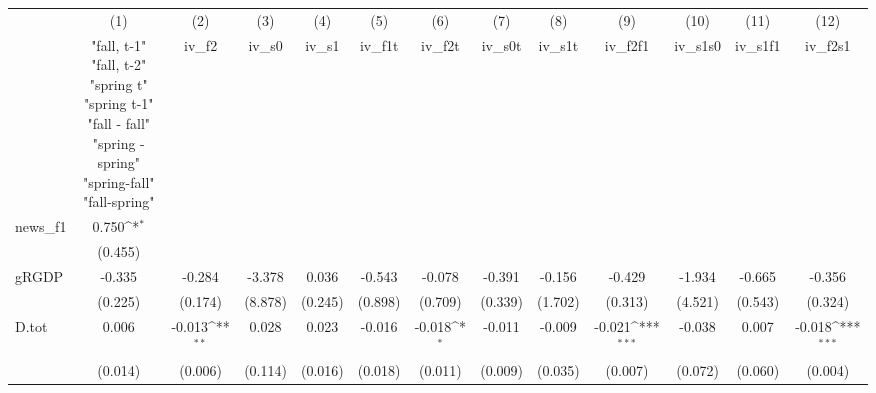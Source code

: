 {
\def\sym#1{\ifmmode^{#1}\else\(^{#1}\)\fi}
\begin{tabular}{l*{12}{c}}
\toprule
            &\multicolumn{1}{c}{(1)}&\multicolumn{1}{c}{(2)}&\multicolumn{1}{c}{(3)}&\multicolumn{1}{c}{(4)}&\multicolumn{1}{c}{(5)}&\multicolumn{1}{c}{(6)}&\multicolumn{1}{c}{(7)}&\multicolumn{1}{c}{(8)}&\multicolumn{1}{c}{(9)}&\multicolumn{1}{c}{(10)}&\multicolumn{1}{c}{(11)}&\multicolumn{1}{c}{(12)}\\
            &\multicolumn{1}{c}{  "fall, t-1" "fall, t-2" "spring t" "spring t-1"  "fall - fall" "spring - spring" "spring-fall" "fall-spring" }&\multicolumn{1}{c}{iv\_f2}&\multicolumn{1}{c}{iv\_s0}&\multicolumn{1}{c}{iv\_s1}&\multicolumn{1}{c}{iv\_f1t}&\multicolumn{1}{c}{iv\_f2t}&\multicolumn{1}{c}{iv\_s0t}&\multicolumn{1}{c}{iv\_s1t}&\multicolumn{1}{c}{iv\_f2f1}&\multicolumn{1}{c}{iv\_s1s0}&\multicolumn{1}{c}{iv\_s1f1}&\multicolumn{1}{c}{iv\_f2s1}\\
\midrule
news\_f1     &       0.750\sym{*}  &                     &                     &                     &                     &                     &                     &                     &                     &                     &                     &                     \\
            &     (0.455)         &                     &                     &                     &                     &                     &                     &                     &                     &                     &                     &                     \\
\addlinespace
gRGDP       &      -0.335         &      -0.284         &      -3.378         &       0.036         &      -0.543         &      -0.078         &      -0.391         &      -0.156         &      -0.429         &      -1.934         &      -0.665         &      -0.356         \\
            &     (0.225)         &     (0.174)         &     (8.878)         &     (0.245)         &     (0.898)         &     (0.709)         &     (0.339)         &     (1.702)         &     (0.313)         &     (4.521)         &     (0.543)         &     (0.324)         \\
\addlinespace
D.tot       &       0.006         &      -0.013\sym{**} &       0.028         &       0.023         &      -0.016         &      -0.018\sym{*}  &      -0.011         &      -0.009         &      -0.021\sym{***}&      -0.038         &       0.007         &      -0.018\sym{***}\\
            &     (0.014)         &     (0.006)         &     (0.114)         &     (0.016)         &     (0.018)         &     (0.011)         &     (0.009)         &     (0.035)         &     (0.007)         &     (0.072)         &     (0.060)         &     (0.004)         \\

\end{tabular}}
